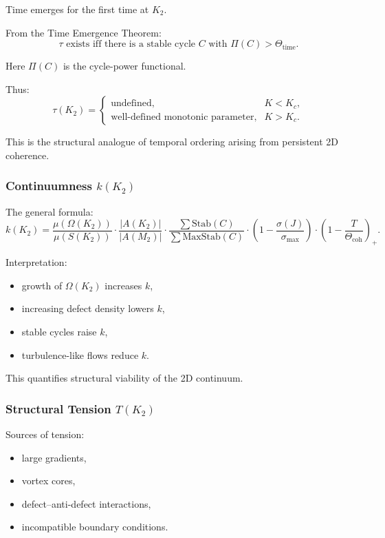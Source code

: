 Time emerges for the first time at $K_2$.

From the Time Emergence Theorem:
\[
\tau \text{ exists iff there is a stable cycle } 
C \text{ with } \Pi(C) > \Theta_{\mathrm{time}}.
\]

Here $\Pi(C)$ is the cycle-power functional.

Thus:
\[
\tau(K_2) =
\begin{cases}
\text{undefined}, & K < K_c, \\
\text{well-defined monotonic parameter}, & K > K_c.
\end{cases}
\]

This is the structural analogue of temporal ordering arising from
persistent 2D coherence.

\subsubsection{Continuumness \texorpdfstring{$k(K_2)$}{k(K_2)}}

The general formula:
\[
k(K_2) =
\frac{\mu(\Omega(K_2))}{\mu(S(K_2))}
\cdot
\frac{|A(K_2)|}{|A(M_2)|}
\cdot
\frac{\sum \mathrm{Stab}(C)}{\sum \mathrm{MaxStab}(C)}
\cdot
\left(1 - \frac{\sigma(J)}{\sigma_{\max}}\right)
\cdot
\left(1 - \frac{T}{\Theta_{\mathrm{coh}}}\right)_+.
\]

Interpretation:
\begin{itemize}
    \item growth of $\Omega(K_2)$ increases $k$,
    \item increasing defect density lowers $k$,
    \item stable cycles raise $k$,
    \item turbulence-like flows reduce $k$.
\end{itemize}

This quantifies structural viability of the 2D continuum.

\subsubsection{Structural Tension \texorpdfstring{$T(K_2)$}{T(K_2)}}

Sources of tension:
\begin{itemize}
    \item large gradients,
    \item vortex cores,
    \item defect–anti-defect interactions,
    \item incompatible boundary conditions.
\end{itemize}

